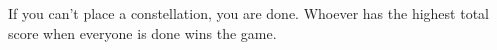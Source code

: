 \begin{minipage}{6cm}
If you can't place a constellation, you are done.
Whoever has the highest total score when everyone is done wins the game.


%
%

\end{minipage}
